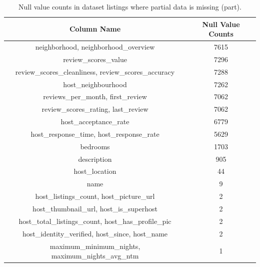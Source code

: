 \documentclass{article}
\begin{document}
	\begin{table}[h]
		\centering
		\begin{tabular}{cc}
			\toprule
			Column Name                                           & Null Value Counts \\
			\midrule
			neighborhood, neighborhood\_overview & 7615              \\
			review\_scores\_value                                    & 7296              \\
			review\_scores\_cleanliness, review\_scores\_accuracy    & 7288              \\
			host\_neighbourhood                                      & 7262              \\
			reviews\_per\_month, first\_review                       & 7062              \\
			review\_scores\_rating, last\_review                     & 7062              \\
			host\_acceptance\_rate                                   & 6779              \\
			host\_response\_time, host\_response\_rate               & 5629              \\
			bedrooms                                                 & 1703              \\
			description                                              & 905               \\
			host\_location                                        & 44                \\
			name                                                  & 9                 \\
			host\_listings\_count, host\_picture\_url             & 2                 \\
			host\_thumbnail\_url, host\_is\_superhost             & 2                 \\
			host\_total\_listings\_count, host\_has\_profile\_pic & 2                 \\
			host\_identity\_verified, host\_since, host\_name     & 2                 \\
			maximum\_minimum\_nights, maximum\_nights\_avg\_ntm   & 1                 \\
			\bottomrule
		\end{tabular}
		\caption{Null value counts in dataset listings where partial data is missing (part).}
	\end{table}
\end{document}
